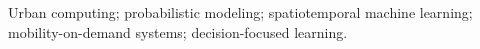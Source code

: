 Urban computing; probabilistic modeling;
spatiotemporal machine learning; mobility-on-demand systems;
decision-focused learning.